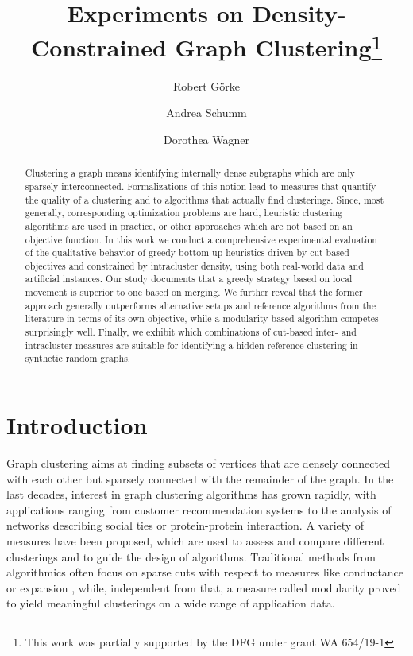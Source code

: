 \documentclass{llncs}
\title{Experiments on Density-Constrained Graph Clustering\thanks{This work was partially supported by the DFG under grant WA 654/19-1}}
\author{Robert G\"orke \and Andrea Schumm \and Dorothea Wagner}
\institute{Institute of Theoretical Informatics, Karlsruhe Institute of Technology, Germany}
\begin{document}
\maketitle
\setcounter{totalnumber}{8}
\setcounter{topnumber}{8}
\setcounter{bottomnumber}{8}
\renewcommand{\textfraction}{0.0}
\renewcommand{\topfraction}{1.0}
\renewcommand{\bottomfraction}{1.0}
\begin{abstract}
Clustering a graph means identifying internally dense subgraphs which are only sparsely interconnected.
Formalizations of this notion lead to measures that quantify the quality of a clustering and to algorithms that actually find clusterings.
Since, most generally, corresponding optimization problems are hard, heuristic clustering algorithms are used in practice, or other approaches which are not based on an objective function.
In this work we conduct a comprehensive experimental evaluation of the qualitative behavior of greedy bottom-up heuristics driven by cut-based objectives and constrained by intracluster density, using both real-world data and artificial instances.
Our study documents that a greedy strategy based on local movement is superior to one based on merging.
We further reveal that the former approach generally outperforms alternative setups and reference algorithms from the literature in terms of its own objective, while a modularity-based algorithm competes surprisingly well.
Finally, we exhibit which combinations of cut-based inter- and intracluster measures are suitable for identifying a hidden reference clustering in synthetic random graphs.
\end{abstract}

\section{Introduction}\label{sec:intro}
Graph clustering aims at finding subsets of vertices that are densely connected with each other but sparsely connected with the remainder of the graph.
In the last decades, interest in graph clustering algorithms has grown rapidly, with applications ranging from customer recommendation systems to the analysis of networks describing social ties or protein-protein interaction. 
A variety of measures have been proposed, which are used to assess and compare different clusterings and to guide the design of algorithms.
Traditional methods from algorithmics often focus on sparse cuts with respect to measures like conductance \cite{kvv-cgds-00} or expansion \cite{hlw-e-06}, while, 
independent from that, a measure called modularity \cite{ng-fecsn-04} proved to yield meaningful clusterings on a wide range of application data. 
\end{document}
